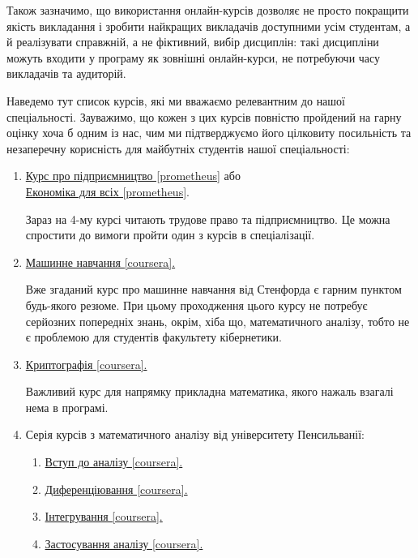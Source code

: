 \documentclass[14pt, a4paper]{extarticle}  %
\begin{document}
Також зазначимо, що використання онлайн-курсів дозволяє не просто покращити якість викладання і зробити найкращих викладачів доступними усім студентам, а й реалізувати справжній, а не фіктивний, вибір дисциплін: такі дисципліни можуть входити у програму як зовнішні онлайн-курси, не потребуючи часу викладачів та аудиторій. 

Наведемо тут список курсів, які ми вважаємо релевантним до нашої спеціальності. Зауважимо, що кожен з цих курсів повністю пройдений на гарну оцінку хоча б одним із нас, чим ми підтверджуємо його цілковиту посильність та незаперечну корисність для майбутніх студентів нашої спеціальності:
\begin{enumerate}
    \item \href{https://prometheus.org.ua/entrepreneurship/}{Курс про підприємництво [prometheus]} або \\ \href{https://edx.prometheus.org.ua/courses/NaUKMA/103/2015_T1/about}{Економіка для всіх [prometheus]}.
    
    Зараз на 4-му курсі читають трудове право та підприємництво. Це можна спростити до вимоги пройти один з курсів в спеціалізації.
    
    \item \href{https://www.coursera.org/learn/machine-learning}{Машинне навчання [coursera].}
    
    Вже згаданий курс про машинне навчання від Стенфорда є гарним пунктом будь-якого резюме. При цьому проходження цього курсу не потребує серйозних попередніх знань, окрім, хіба що, математичного аналізу, тобто не є проблемою для студентів факультету кібернетики.
    
    \item \href{https://www.coursera.org/learn/crypto}{Криптографія [coursera].}
    
    Важливий курс для напрямку прикладна математика, якого нажаль взагалі нема в програмі.
    
    \item Серія курсів з математичного аналізу від університету Пенсильванії:
	\begin{enumerate}
		\item \href{https://www.coursera.org/learn/single-variable-calculus/home/welcome}{Вступ до аналізу [coursera].}
		\item \href{https://www.coursera.org/learn/differentiation-calculus/home/welcome}{Диференціювання [coursera].}
		\item \href{https://www.coursera.org/learn/integration-calculus/home/welcome}{Інтегрування [coursera].}
		\item \href{https://www.coursera.org/learn/applications-calculus/home/welcome}{Застосування аналізу [coursera].}
	\end{enumerate}
    

\end{enumerate}
\end{document}
